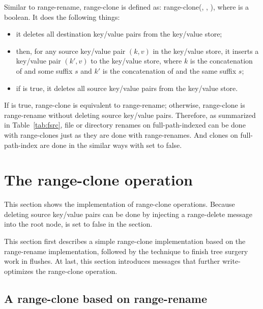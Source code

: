 Similar to range-rename, range-clone is defined as:
range-clone(\spre, \dpre, \delold), where \delold is a boolean.
It does the following things:
\begin{itemize}
\item it deletes all destination key/value pairs from the key/value store;
\item then, for any source key/value pair $(k,v)$ in the key/value store,
it inserts a key/value pair $(k',v)$ to the key/value store,
where $k$ is the concatenation of \spre and some suffix $s$ and $k'$ is the
concatenation of \dpre and the same suffix $s$;
\item if \delold is true, it deletes all source key/value pairs from the
key/value store.
\end{itemize}
If \delold is true, range-clone is equivalent to range-rename;
otherwise, range-clone is range-rename without deleting source key/value pairs.
Therefore, as summarized in Table~\ref{tab:fsrc},
file or directory renames on full-path-indexed \betrfs can be done
with range-clones just as they are done with range-renames.
And clones on full-path-index \betrfs are done in the similar ways with \delold
set to false.

\section{The range-clone operation}

This section shows the implementation of range-clone operations.
Because deleting source key/value pairs can be done by injecting a range-delete
message into the root node,
\delold is set to false in the section.

This section first describes a simple range-clone implementation based on the
range-rename implementation,
followed by the technique to finish tree surgery work in flushes.
At last, this section introduces \goto messages that further write-optimizes
the range-clone operation.

\subsection{A range-clone based on range-rename}

